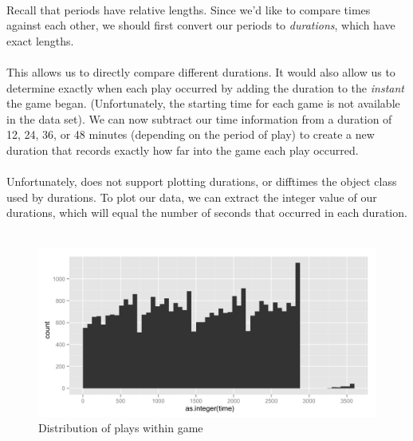\documentclass[article]{jss}
\begin{document}
\\

Recall that periods have relative lengths. Since we'd like to compare times against each other, we should first convert our periods to \emph{durations}, which have exact lengths.\\

\\

This allows us to directly compare different durations. It would also allow us to determine exactly when each play occurred by adding the duration to the \emph{instant} the game began. (Unfortunately, the starting time for each game is not available in the data set). We can now subtract our time information from a duration of 12, 24, 36, or 48 minutes (depending on the period of play) to create a new duration that records exactly how far into the game each play occurred.\\

\\

Unfortunately,  does not support plotting durations, or difftimes the object class used by durations. To plot our data, we can extract the integer value of our durations, which will equal the number of seconds that occurred in each duration.\\

\\

\begin{figure}[htpb]
  \centering
  \includegraphics[width=\textwidth]{play-time-histogram.png}        
  \caption{Distribution of plays within game}
  \label{fig:plays}
\end{figure}
\end{document}

